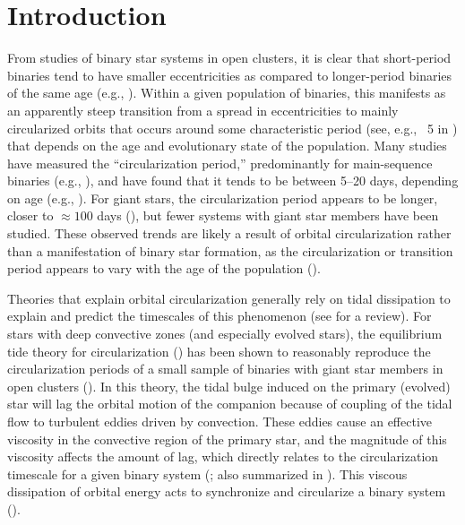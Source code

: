 \documentclass[modern, letterpaper]{aastex62}
\begin{document}

\section{Introduction} \label{sec:intro}

From studies of binary star systems in open clusters, it is clear that
short-period binaries tend to have smaller eccentricities as compared to
longer-period binaries of the same age (e.g., \citealt{Mathieu:2005}).
Within a given population of binaries, this manifests as an apparently steep
transition from a spread in eccentricities to mainly circularized orbits
that occurs around some characteristic period (see, e.g., \figurename~5 in
\citealt{Mathieu:2005}) that depends on the age and evolutionary state of the
population.
Many studies have measured the ``circularization period,'' predominantly for
main-sequence binaries (e.g., \citealt{Latham:2002, Meibom:2006,
Kjurkchieva:2017}), and have found that it tends to be between 5--20 days,
depending on age (e.g., \citealt{Mathieu:1988}).
For giant stars, the circularization period appears to be longer, closer to
$\approx 100$ days (\citealt{Mayor:1984}), but fewer systems with giant star
members have been studied.
These observed trends are likely a result of orbital circularization rather than
a manifestation of binary star formation, as the circularization or transition
period appears to vary with the age of the population (\citealt{Meibom:2005}).

Theories that explain orbital circularization generally rely on tidal
dissipation to explain and predict the timescales of this phenomenon (see
\citealt{Mazeh:2007hp} for a review).
For stars with deep convective zones (and especially evolved stars), the
equilibrium tide theory for circularization (\citealt{Zahn:1977, Zahn:1989}) has
been shown to reasonably reproduce the circularization periods of a small sample
of binaries with giant star members in open clusters (\citealt{Verbunt:1995}).
In this theory, the tidal bulge induced on the primary (evolved) star will lag
the orbital motion of the companion because of coupling of the tidal flow to
turbulent eddies driven by convection.
These eddies cause an effective viscosity in the convective region of the
primary star, and the magnitude of this viscosity affects the amount of lag,
which directly relates to the circularization timescale for a given binary
system (\citealt{Zahn:1989}; also summarized in \citealt{Goodman:1997}).
This viscous dissipation of orbital energy acts to synchronize and circularize a
binary system (\citealt{Zahn:1977, Zahn:1989}).
\end{document}

